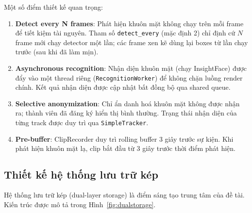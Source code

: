 \medskip
Một số điểm thiết kế quan trọng:

\begin{enumerate}[1.]
    \item \textbf{Detect every N frames}: Phát hiện khuôn mặt không chạy trên mỗi frame để tiết kiệm tài nguyên. Tham số \texttt{detect\_every} (mặc định 2) chỉ định cứ $N$ frame mới chạy detector một lần; các frame xen kẽ dùng lại boxes từ lần chạy trước (sau khi đã làm mịn).
    \item \textbf{Asynchronous recognition}: Nhận diện khuôn mặt (chạy InsightFace) được đẩy vào một thread riêng (\texttt{RecognitionWorker}) để không chặn luồng render chính. Kết quả nhận diện được cập nhật bất đồng bộ qua shared queue.
    \item \textbf{Selective anonymization}: Chỉ ẩn danh hoá khuôn mặt không được nhận ra; thành viên đã đăng ký hiển thị bình thường. Trạng thái nhận diện của từng track được duy trì qua \texttt{SimpleTracker}.
    \item \textbf{Pre-buffer}: ClipRecorder duy trì rolling buffer 3 giây trước sự kiện. Khi phát hiện khuôn mặt lạ, clip bắt đầu từ 3 giây trước thời điểm phát hiện.
\end{enumerate}

\subsection{Thiết kế hệ thống lưu trữ kép}
\label{subsec:dualstorage}

Hệ thống lưu trữ kép (dual-layer storage) là điểm sáng tạo trung tâm của đề tài. Kiến trúc được mô tả trong Hình~\ref{fig:dualstorage}.


